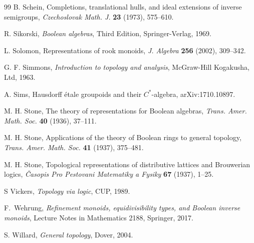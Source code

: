 \documentclass[a4paper]{amsart}
\begin{document}
\begin{thebibliography}{99}
 B. Schein, Completions, translational hulls, and ideal extensions of inverse semigroups,
{\em Czechoslovak Math. J.} {\bf 23} (1973), 575--610.

 R. Sikorski, {\em Boolean algebras}, Third Edition, Springer-Verlag, 1969.

 L. Solomon, Representations of rook monoids, {\em J. Algebra} {\bf 256} (2002), 309--342. 

 G. F. Simmons, {\em Introduction to topology and analysis}, McGraw-Hill Kogakusha, Ltd, 1963.

 A. Sims, Hausdorff \'etale groupoids and their $C^{\ast}$-algebra, arXiv:1710.10897.

 M. H. Stone, The theory of representations for Boolean algebras, {\em Trans. Amer. Math. Soc.} {\bf 40} (1936), 37--111.

 M. H. Stone, Applications of the theory of Boolean rings to general topology, {\em Trans. Amer. Math. Soc.} {\bf 41} (1937), 375--481.

 M. H. Stone, Topological representations of distributive lattices and Brouwerian logics,
{\em \v{C}asopis Pro Pestovani Matematiky a Fysiky} {\bf 67} (1937), 1--25. 

 S Vickers, {\em Topology via logic}, CUP, 1989.

 F.~Wehrung, {\em Refinement monoids, equidivisibility types, and Boolean inverse monoids}, Lecture Notes in Mathematics 2188, Springer, 2017.

 S. Willard, {\em General topology}, Dover, 2004.

\end{thebibliography}
\end{document}

